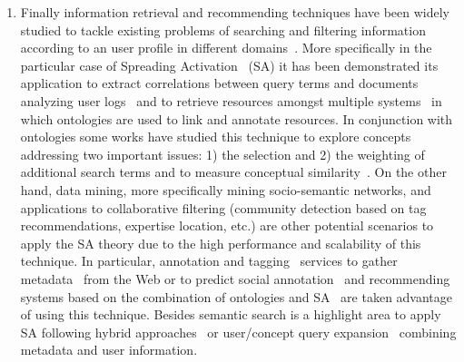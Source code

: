 \begin{enumerate}
 \item Finally information retrieval and recommending techniques have been widely studied to tackle existing problems of searching 
 and filtering information according to an user profile in different domains~\cite{freews}. More specifically in the particular 
 case of Spreading Activation~\cite{Collins_Loftus_1975,Scott1981} (SA) it has been demonstrated its application to 
 extract correlations between query terms and documents analyzing user logs~\cite{Cui:2003:QEM:1435677.858986} and to retrieve resources amongst multiple 
 systems~\cite{Schumacher:2008:CFD:1789394.1789447} in which ontologies are used to link and annotate resources. In conjunction with ontologies some works 
 have studied this technique to explore concepts addressing two important issues: 1) the selection and
 2) the weighting of  additional search terms and to measure conceptual similarity~\cite{gouws-vanrooyen-engelbrecht:2010:CCSR}. 
 On the other hand, data mining, more specifically mining socio-semantic networks\cite{Troussov08miningsocio-semantic}, and applications to collaborative filtering 
 (community detection based on tag recommendations, expertise location, etc.) are other potential scenarios to apply the SA theory due to 
 the high performance and scalability of this technique. In particular, annotation and tagging~\cite{LabraGayo:2010:WAS:1668126.1668147,DBLP:journals/ijksr/RodriguezGP12} services 
 to gather metadata~\cite{GelgiVD05} from the Web or to predict social annotation~\cite{Chen:2007:PSA:1780653.1780702} and recommending
 systems based on the combination of ontologies and SA~\cite{Gao:2008:SAR:1441425.1441845} are taken advantage of using this technique. Besides 
 semantic search is a highlight area to apply SA following hybrid approaches~\cite{DBLP:conf/jckbse/BerruetaGP06,Rocha:2004:HAS:988672.988723} or user/concept
 query expansion~\cite{Nie:2003:QEQ:767396.767402} combining metadata and user information.

 \end{enumerate}
  
